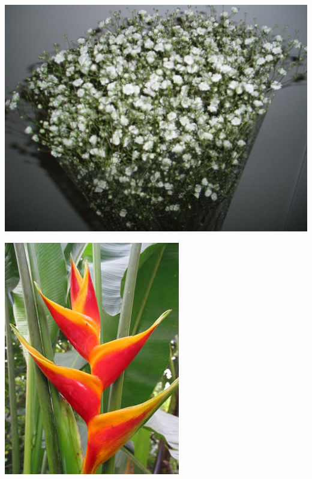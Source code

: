 \documentclass{article}
\begin{document}
\begin{center}
\includegraphics[height=0.9\textheight, angle=90]{../Gypsophilia.jpg}
\end{center}
\newpage

\begin{center}
\includegraphics[height=0.9\textheight, angle=90]{../Heliconia.jpg}
\end{center}
\newpage
\end{document}
